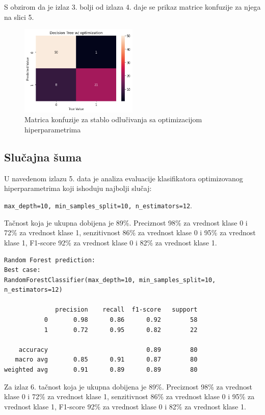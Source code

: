 \documentclass[fontsize=12bp, paper=a4]{scrarticle}
\begin{document}
S obzirom da je izlaz 3. bolji od izlaza 4. daje se prikaz matrice konfuzije za njega na slici 5.

\begin{figure}[h!]
    \centering
    \includegraphics[width=0.5\textwidth]{34.png}
    \caption{Matrica konfuzije za stablo odlučivanja sa optimizacijom hiperparametrima}
\end{figure}

\subsection{Slučajna šuma}

U navedenom izlazu 5. data je analiza evaluacije klasifikatora 
 optimizovanog hiperparametrima koji ishoduju najbolji slučaj: 
 
 \verb|max_depth=10, min_samples_split=10, n_estimators=12|.

 Tačnost koja je ukupna dobijena je 89\%. Preciznost 98\% za vrednost klase 0 i 72\% za vrednost klase 1, senzitivnost 86\% za vrednost klase 0 i 95\% za vrednost klase 1, F1-score 92\% za vrednost klase 0 i 82\% za vrednost klase 1.
\begin{lstlisting}[caption=Slučajne šume sa optimizacijom hiperparametara]
   Random Forest prediction:
Best case:
RandomForestClassifier(max_depth=10, min_samples_split=10, n_estimators=12)

              precision    recall  f1-score   support
           0       0.98      0.86      0.92        58
           1       0.72      0.95      0.82        22

    accuracy                           0.89        80
   macro avg       0.85      0.91      0.87        80
weighted avg       0.91      0.89      0.89        80

\end{lstlisting}

Za izlaz 6. tačnost koja je ukupna dobijena je 89\%. Preciznost 98\% za vrednost klase 0 i 72\% za vrednost klase 1, senzitivnost 86\% za vrednost klase 0 i 95\% za vrednost klase 1, F1-score 92\% za vrednost klase 0 i 82\% za vrednost klase 1.
\end{document}
